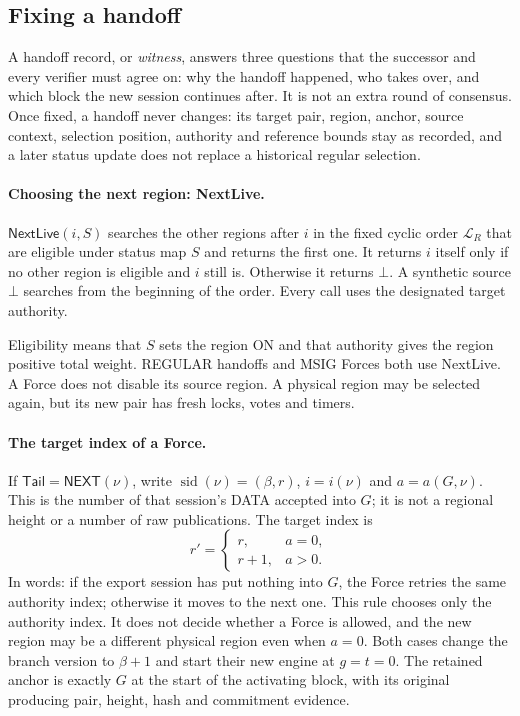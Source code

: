 \documentclass[11pt,a4paper]{article}
\newcommand{\tagg}[1]{\ensuremath{\mathsf{#1}}}
\newcommand{\defterm}[1]{\textcolor{rrBlue}{\textit{#1}}}
\begin{document}
\subsection{Fixing a handoff}
\label{sec:witness}
A handoff record, or \defterm{witness}, answers three questions that the
successor and every verifier must agree on: why the handoff happened,
who takes over, and which block the new session continues after. It is
not an extra round of consensus. Once fixed, a handoff never changes:
its target pair, region, anchor, source context, selection position,
authority and reference bounds stay as recorded, and a later status
update does not replace a historical regular selection.

\paragraph{Choosing the next region: NextLive.}
$\tagg{NextLive}(i,S)$ searches the other regions after $i$ in the
fixed cyclic order $\mathcal L_R$ that are eligible under status map $S$
and returns the first one. It
returns $i$ itself only if no other region is eligible and $i$ still is.
Otherwise it returns $\bot$. A synthetic source $\bot$ searches from the
beginning of the order. Every call uses the designated target authority.

Eligibility means that $S$ sets the region ON and that authority gives
the region positive total weight. REGULAR handoffs and MSIG Forces both
use NextLive. A Force does not disable its source region. A physical
region may be selected again, but its new pair has fresh locks, votes and
timers.


\paragraph{The target index of a Force.}
\label{sec:retry-slot}
If $\mathsf{Tail}=\tagg{NEXT}(\nu)$, write
$\operatorname{sid}(\nu)=(\beta,r)$, $i=i(\nu)$ and
$a=a(G,\nu)$.  This is the number of that session's DATA accepted into
$G$; it is not a regional height or a number of raw publications. The
target index is
\[
 r'=
 \begin{cases}
 r,&a=0,\\
 r+1,&a>0.
 \end{cases}
\]
In words: if the export session has put nothing into $G$, the Force
retries the same authority index; otherwise it moves to the next one.
This rule chooses only the authority index. It does not decide whether a
Force is allowed, and the new region may be a different physical region
even when $a=0$. Both cases change the branch version to $\beta+1$ and
start their new engine at $g=t=0$. The retained anchor is exactly $G$ at
the start of the activating block, with its original producing pair,
height, hash and commitment evidence.
\end{document}
